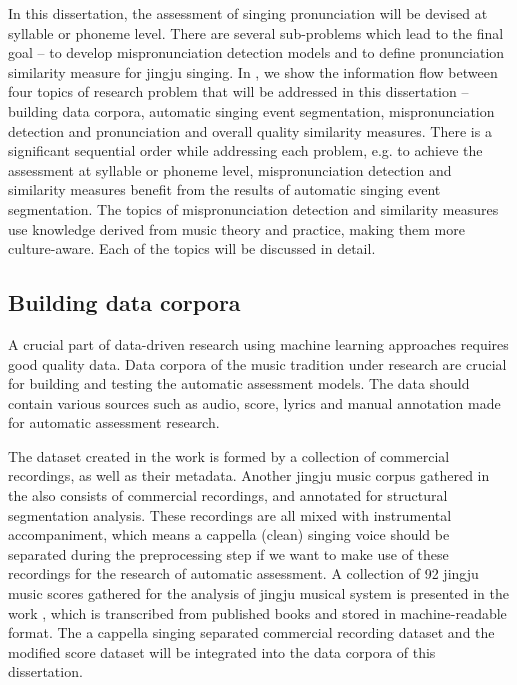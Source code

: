 In this dissertation, the assessment of singing pronunciation will be devised at syllable or phoneme level. There are several sub-problems which lead to the final goal -- to develop mispronunciation detection models and to define pronunciation similarity measure for jingju singing. In , we show the information flow between four topics of research problem that will be addressed in this dissertation -- building data corpora, automatic singing event segmentation, mispronunciation detection and pronunciation and overall quality similarity measures. There is a significant sequential order while addressing each problem, e.g. to achieve the assessment at syllable or phoneme level, mispronunciation detection and similarity measures benefit from the results of automatic singing event segmentation. The topics of mispronunciation detection and similarity measures use knowledge derived from music theory and practice, making them more culture-aware. Each of the topics will be discussed in detail.

\subsection{Building data corpora}

A crucial part of data-driven research using machine learning approaches requires good quality data. Data corpora of the music tradition under research are crucial for building and testing the automatic assessment models. The data should contain various sources such as audio, score, lyrics and manual annotation made for automatic assessment research.

The dataset created in the work \cite{repetto_creating_2014} is formed by a collection of commercial recordings, as well as their metadata. Another jingju music corpus gathered in the \cite{Tian2016} also consists of commercial recordings, and annotated for structural segmentation analysis. These recordings are all mixed with instrumental accompaniment, which means a cappella (clean) singing voice should be separated during the preprocessing step if we want to make use of these recordings for the research of automatic assessment. A collection of 92 jingju music scores gathered for the analysis of jingju musical system is presented in the work \cite{Repetto2017}, which is transcribed from published books and stored in machine-readable format. The a cappella singing separated commercial recording dataset and the modified score dataset will be integrated into the data corpora of this dissertation.

